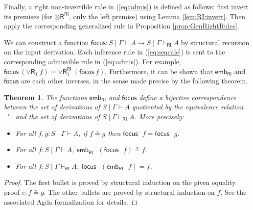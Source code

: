 \documentclass[submission,copyright,creativecommons]{eptcs}
\newtheorem{theorem}{Theorem}[section]
\theoremstyle{definition}
\newcommand{\tr}{\otimes \mathsf{R}}
\newcommand{\andr}{\land \mathsf{R}}
\newcommand{\orrone}{\lor \mathsf{R}_{1}}
\newcommand{\RI}{\mathsf{RI}}
\newcommand{\LI}{\mathsf{LI}}
\newcommand{\proofbox}[1]{\begin{tabular}{l} #1 \end{tabular}}
\begin{document}
Finally, a right non-invertible rule in (\ref{eq:admis}) is defined as follows: first invert its premises (for $\tr^{\RI}$, only the left premise) using Lemma \ref{lem:RI:invert}. Then apply the corresponding generalized  rule in Proposition \ref{prop:GenRightRules}.

We can construct a function $\mathsf{focus} : S \mid \Gamma \vdash A \to S \mid \Gamma \vdash_{\RI} A$ by structural recursion on the input derivation. Each inference rule in (\ref{eq:seqcalc}) is sent to the corresponding admissible rule in (\ref{eq:admis}).
For example, $\mathsf{focus} \ (\orrone \ f) = \orrone^{\RI} \ (\mathsf{focus} \ f)$. Furthermore, it can be shown that $\mathsf{emb}_{\RI}$ and $\mathsf{focus}$ are each other inverses, in the sense made precise by the following theorem.
\begin{theorem}
  The functions $\mathsf{emb}_{\RI}$ and $\mathsf{focus}$ define a bijective correspondence between the set of derivations of $S \mid \Gamma \vdash A$ quotiented by the equivalence relation $\circeq$ and the set of derivations of $S \mid \Gamma \vdash_{\RI} A$. More precisely:
  \begin{itemize}
    \item For all $f, g : S \mid \Gamma \vdash A$, if $f \circeq g$ then $\mathsf{focus} \text{ } f = \mathsf{focus} \text{ } g$.
    \item For all $f : S \mid \Gamma \vdash A$, $\mathsf{emb}_{\RI} \text{ } (\mathsf{focus} \text{ } f) \circeq f$.
    \item For all $f : S \mid \Gamma \vdash_{\RI} A$, $\mathsf{focus} \text{ } (\mathsf{emb}_{\RI} \text{ } f) = f$.
  \end{itemize}
\end{theorem}
\begin{proof}
  The first bullet is proved by structural induction on the given equality proof $e : f \circeq g$. The other bullets are proved by structural induction on $f$. See the associated Agda formalization for details.
\end{proof}
\end{document}
